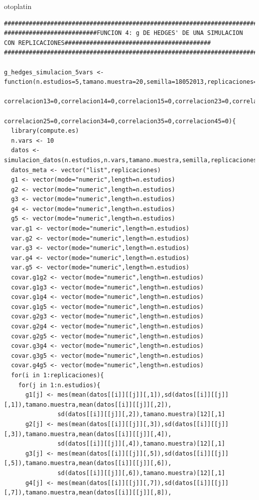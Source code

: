 otoplatin\documentclass[a4paper,openright,12pt]{report}
\begin{document}
{\begin{verbatim}
##############################################################################################################################
##########################FUNCION 4: g DE HEDGES' DE UNA SIMULACION CON REPLICACIONES#########################################
##############################################################################################################################

g_hedges_simulacion_5vars <- function(n.estudios=5,tamano.muestra=20,semilla=18052013,replicaciones=5,correlacion12=0,
                                      correlacion13=0,correlacion14=0,correlacion15=0,correlacion23=0,correlacion24=0,
                                      correlacion25=0,correlacion34=0,correlacion35=0,correlacion45=0){
  library(compute.es)
  n.vars <- 10
  datos <- simulacion_datos(n.estudios,n.vars,tamano.muestra,semilla,replicaciones)
  datos_meta <- vector("list",replicaciones)
  g1 <- vector(mode="numeric",length=n.estudios)
  g2 <- vector(mode="numeric",length=n.estudios)
  g3 <- vector(mode="numeric",length=n.estudios)
  g4 <- vector(mode="numeric",length=n.estudios)
  g5 <- vector(mode="numeric",length=n.estudios)
  var.g1 <- vector(mode="numeric",length=n.estudios)
  var.g2 <- vector(mode="numeric",length=n.estudios)
  var.g3 <- vector(mode="numeric",length=n.estudios)
  var.g4 <- vector(mode="numeric",length=n.estudios)
  var.g5 <- vector(mode="numeric",length=n.estudios)
  covar.g1g2 <- vector(mode="numeric",length=n.estudios) 
  covar.g1g3 <- vector(mode="numeric",length=n.estudios)
  covar.g1g4 <- vector(mode="numeric",length=n.estudios) 
  covar.g1g5 <- vector(mode="numeric",length=n.estudios) 
  covar.g2g3 <- vector(mode="numeric",length=n.estudios)
  covar.g2g4 <- vector(mode="numeric",length=n.estudios) 
  covar.g2g5 <- vector(mode="numeric",length=n.estudios) 
  covar.g3g4 <- vector(mode="numeric",length=n.estudios) 
  covar.g3g5 <- vector(mode="numeric",length=n.estudios) 
  covar.g4g5 <- vector(mode="numeric",length=n.estudios) 
  for(i in 1:replicaciones){
    for(j in 1:n.estudios){
      g1[j] <- mes(mean(datos[[i]][[j]][,1]),sd(datos[[i]][[j]][,1]),tamano.muestra,mean(datos[[i]][[j]][,2]),
               sd(datos[[i]][[j]][,2]),tamano.muestra)[12][,1]
      g2[j] <- mes(mean(datos[[i]][[j]][,3]),sd(datos[[i]][[j]][,3]),tamano.muestra,mean(datos[[i]][[j]][,4]),
               sd(datos[[i]][[j]][,4]),tamano.muestra)[12][,1]
      g3[j] <- mes(mean(datos[[i]][[j]][,5]),sd(datos[[i]][[j]][,5]),tamano.muestra,mean(datos[[i]][[j]][,6]),
               sd(datos[[i]][[j]][,6]),tamano.muestra)[12][,1]
      g4[j] <- mes(mean(datos[[i]][[j]][,7]),sd(datos[[i]][[j]][,7]),tamano.muestra,mean(datos[[i]][[j]][,8]),

\end{verbatim}}
\end{document}
